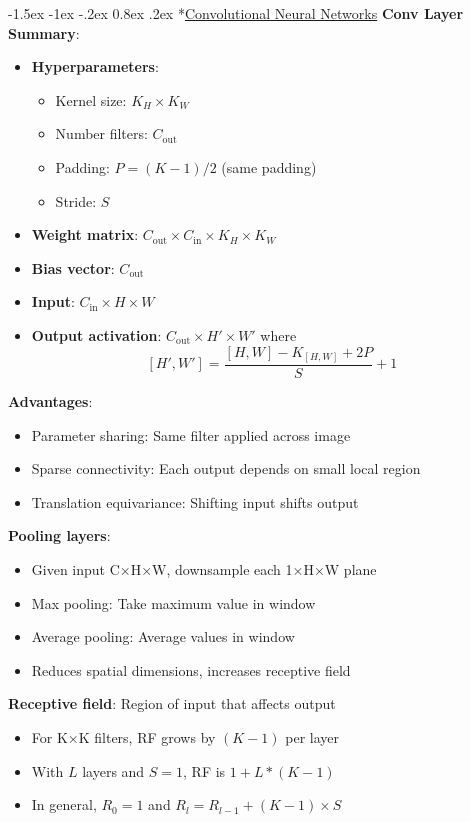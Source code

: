 \documentclass{article}
\makeatletter
\renewcommand\section{\@startsection{section}{1}{\z@}%
                                  {-1.5ex \@plus -1ex \@minus -.2ex}%
                                  {0.8ex \@plus.2ex}%
                                  {\normalfont\small\bfseries}}
\makeatother
\begin{document}
\begin{multicols}{3}
\section*{\underline{Convolutional Neural Networks}}
\textbf{Conv Layer Summary}:
\begin{itemize}
\item \textbf{Hyperparameters}:
\begin{itemize}
\item Kernel size: $K_H \times K_W$
\item Number filters: $C_{\text{out}}$
\item Padding: $P = (K-1)/2$ (same padding)
\item Stride: $S$
\end{itemize}
\item \textbf{Weight matrix}: $C_{\text{out}} \times C_{\text{in}} \times K_H \times K_W$
\item \textbf{Bias vector}: $C_{\text{out}}$
\item \textbf{Input}: $C_{\text{in}} \times H \times W$
\item \textbf{Output activation}: $C_{\text{out}} \times H' \times W'$ where
$$
[H', W'] = \frac{[H, W] - K_{[H, W]} + 2P}{S} + 1
$$
\end{itemize}

\textbf{Advantages}:
\begin{itemize}
\item Parameter sharing: Same filter applied across image
\item Sparse connectivity: Each output depends on small local region
\item Translation equivariance: Shifting input shifts output
\end{itemize}

\textbf{Pooling layers}: 
\begin{itemize}
\item Given input C×H×W, downsample each 1×H×W plane
\item Max pooling: Take maximum value in window
\item Average pooling: Average values in window
\item Reduces spatial dimensions, increases receptive field
\end{itemize}

\textbf{Receptive field}: Region of input that affects output
\begin{itemize}
\item For K×K filters, RF grows by $(K-1)$ per layer
\item With $L$ layers and $S=1$, RF is $1 + L * (K - 1)$
\item In general, $R_0 = 1$ and $R_l = R_{l-1} + (K-1) \times S$
\end{itemize}


\end{multicols}
\end{document}
